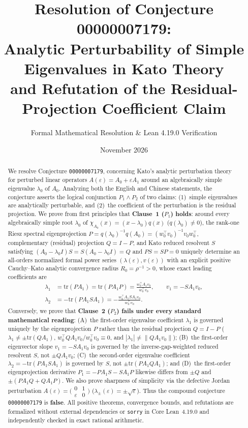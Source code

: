 \documentclass[11pt,a4paper]{article}
\title{\textbf{Resolution of Conjecture 00000007179:\\
Analytic Perturbability of Simple Eigenvalues in Kato Theory\\
and Refutation of the Residual-Projection Coefficient Claim}}
\author{Formal Mathematical Resolution \& Lean 4.19.0 Verification}
\date{November 2026}
\theoremstyle{definition}
\newcommand{\tr}{\mathrm{tr}}
\begin{document}
\maketitle

\begin{abstract}
We resolve Conjecture \texttt{00000007179}, concerning Kato's analytic perturbation
theory for perturbed linear operators $A(\varepsilon) = A_0 + \varepsilon A_1$ around
an algebraically simple eigenvalue $\lambda_0$ of $A_0$. Analyzing both the English
and Chinese statements, the conjecture asserts the logical conjunction $P_1 \land P_2$
of two claims: (1)~simple eigenvalues are analytically perturbable, and (2)~the
coefficient of the perturbation is the residual projection. We prove from first
principles that \textbf{Clause~1 ($P_1$) holds}: around every algebraically simple
root $\lambda_0$ of $\chi_{A_0}(x) = (x - \lambda_0)q(x)$ ($q(\lambda_0) \neq 0$),
the rank-one Riesz spectral eigenprojection $P = q(\lambda_0)^{-1} q(A_0) =
(w_0^\top v_0)^{-1} v_0 w_0^\top$, complementary (residual) projection $Q = I - P$,
and Kato reduced resolvent $S$ satisfying $(A_0 - \lambda_0 I)S = S(A_0 - \lambda_0 I)
= Q$ and $PS = SP = 0$ uniquely determine an all-orders normalized formal power series
$(\lambda(\varepsilon), v(\varepsilon))$ with an explicit positive Cauchy--Kato
analytic convergence radius $R_0 = \rho^{-1} > 0$, whose exact leading coefficients are
\begin{align*}
  \lambda_1 &= \tr(P A_1) = \tr(P A_1 P) = \frac{w_0^\top A_1 v_0}{w_0^\top v_0},
  \qquad v_1 = - S A_1 v_0, \\
  \lambda_2 &= -\tr(P A_1 S A_1) = -\frac{w_0^\top A_1 S A_1 v_0}{w_0^\top v_0}.
\end{align*}
Conversely, we prove that \textbf{Clause~2 ($P_2$) fails under every standard
mathematical reading}: (A)~the first-order eigenvalue coefficient $\lambda_1$ is
governed uniquely by the eigenprojection $P$ rather than the residual projection
$Q = I - P$ ($\lambda_1 \neq \pm\tr(Q A_1)$, $w_0^\top Q A_1 v_0 / w_0^\top v_0 \equiv 0$,
and $|\lambda_1| \neq \|Q A_1 v_0\|$); (B)~the first-order eigenvector slope $v_1 =
- S A_1 v_0$ is governed by the inverse-gap-weighted reduced resolvent $S$, not
$\pm Q A_1 v_0$; (C)~the second-order eigenvalue coefficient $\lambda_2 =
-\tr(P A_1 S A_1)$ is governed by $S$, not $\pm\tr(P A_1 Q A_1)$; and (D)~the
first-order eigenprojection derivative $P_1 = - P A_1 S - S A_1 P$ likewise differs
from $\pm Q$ and $\pm(P A_1 Q + Q A_1 P)$. We also prove sharpness of simplicity via
the defective Jordan perturbation $A(\varepsilon) = \bigl(\begin{smallmatrix} 0 & 1 \\
\varepsilon & 0 \end{smallmatrix}\bigr)$ ($\lambda_\pm(\varepsilon) = \pm\sqrt{\varepsilon}$).
Thus the compound conjecture \texttt{00000007179} is \textbf{false}. All positive
theorems, convergence bounds, and refutations are formalized without external
dependencies or \texttt{sorry} in Core Lean~4.19.0 and independently checked in exact
rational arithmetic.
\end{abstract}
\end{document}
